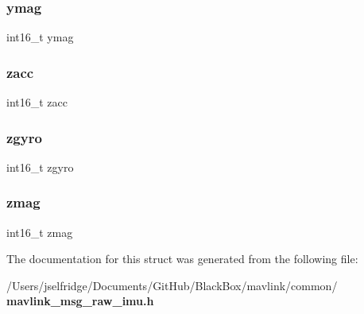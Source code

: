 \subsubsection{ymag}
{\footnotesize\ttfamily int16\+\_\+t ymag}

\mbox{\label{struct____mavlink__raw__imu__t_a7dffba55b24c21b89666ccb25cd93661}} 
\subsubsection{zacc}
{\footnotesize\ttfamily int16\+\_\+t zacc}

\mbox{\label{struct____mavlink__raw__imu__t_a255d904088fc3badb81a91cdc631412d}} 
\subsubsection{zgyro}
{\footnotesize\ttfamily int16\+\_\+t zgyro}

\mbox{\label{struct____mavlink__raw__imu__t_a48671c446eae0d12301740ab002d73b2}} 
\subsubsection{zmag}
{\footnotesize\ttfamily int16\+\_\+t zmag}



The documentation for this struct was generated from the following file\+:\begin{DoxyCompactItemize}
\item 
/\+Users/jselfridge/\+Documents/\+Git\+Hub/\+Black\+Box/mavlink/common/\textbf{ mavlink\+\_\+msg\+\_\+raw\+\_\+imu.\+h}\end{DoxyCompactItemize}

